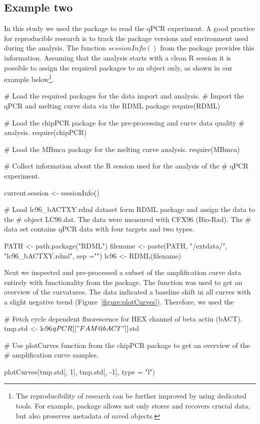 \subsection{Example two}

In this study we used the  package to read the qPCR experiment. 
A good practice for 
reproducible research is to track the package versions and environment used 
during the analysis. The function $sessionInfo()$ from the  
package provides this information. Assuming that the analysis starts with a 
clean R session it is possible to assign the required packages to an object 
only, as shown in our example below\footnote{The reproducibility of research can 
be further improved by using dedicated tools. For example,  package
allows not only stores and recovers crucial data, but also preserves metadata
of saved objects.}.

\begin{example}
# Load the required packages for the data import and analysis.
# Import the qPCR and melting curve data via the RDML package
require(RDML)

# Load the chipPCR package for the pre-processing and curve data quality
# analysis.
require(chipPCR)

# Load the MBmca package for the melting curve analysis.
require(MBmca)

# Collect information about the R session used for the analysis of the
# qPCR experiment.

current.session <- sessionInfo()

# Load lc96_bACTXY.rdml dataset form RDML package and assign the data to the 
# object LC96.dat. The data were measured with CFX96 (Bio-Rad). The 
# data set contains qPCR data with four targets and two types.

PATH <- path.package("RDML")
filename <- paste(PATH, "/extdata/", "lc96_bACTXY.rdml", sep ="")
lc96 <- RDML(filename)
\end{example}

Next we inspected and pre-processed a subset of the amplification curve data 
entirely with functionality from the  package. The 
 function was used to get an overview of the curvatures. The 
data indicated a baseline shift in all curves with a slight negative trend 
(Figure~\ref{figure:plotCurves}). Therefore, we used the 

\begin{example}
# Fetch cycle dependent fluorescence for HEX channel of beta actin (bACT).
tmp.std <- lc96$qPCR[["FAM@bACT"]]$std


# Use plotCurves function from the chipPCR package to get an overview of the 
# amplification curve samples.

plotCurves(tmp.std[, 1], tmp.std[, -1], type = "l")

\end{example}


